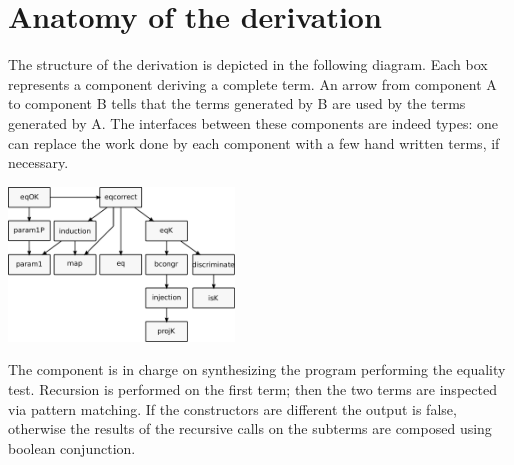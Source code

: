 \documentclass[sigplan,10pt,review]{acmart}\settopmatter{printfolios=true,printccs=false,printacmref=false}
\newcommand{\derive}[1]{\keys{#1}}
\begin{document}
\section{Anatomy of the derivation} %
\label{sec:code}

The structure of the derivation is depicted in the following diagram.
Each box represents a component deriving a complete term.
An arrow from component A to component B tells that the terms
generated by B are used by the terms generated by A. The interfaces
between these components are indeed types: one can replace the work
done by each component with a few hand written terms, if necessary.

\includegraphics[width=0.45\textwidth]{derive.pdf}

The \derive{eq} component is in charge on synthesizing the program
performing the equality test. Recursion is performed on the first
term; then the two terms are inspected via pattern matching. If the
constructors are different the output is false, otherwise the
results of the recursive calls on the subterms are composed using
boolean conjunction.
\end{document}
